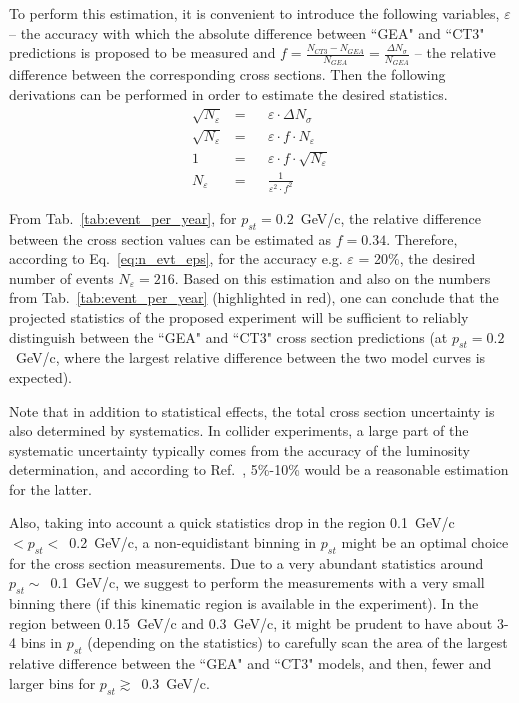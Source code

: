 To perform this estimation, it is convenient to introduce the following variables, $\varepsilon$ -- the accuracy with which the absolute difference between ``GEA" and ``CT3" predictions is proposed to be measured and $f=\frac{N_{CT3} -N_{GEA}}{N_{GEA}}=\frac{\Delta N_{\sigma}}{N_{GEA}}$ -- the relative difference between the corresponding cross sections. Then the following derivations can be performed in order to estimate the desired statistics.
\begin{equation}
\begin{aligned}
\sqrt{N_{\varepsilon}} & = && \varepsilon \cdot \Delta N_{\sigma} \\
\sqrt{N_{\varepsilon}} & = && \varepsilon \cdot f \cdot  N_{\varepsilon}\\
1 & = && \varepsilon \cdot f \cdot \sqrt{N_{\varepsilon}}\\
N_{\varepsilon} &=&& \frac{1}{\varepsilon^{2} \cdot f^{2}}
\end{aligned}\label{eq:n_evt_eps} 
\end{equation}

From Tab.~\ref{tab:event_per_year}, for $p_{st} = 0.2$~GeV/c, the relative difference between the cross section values can be estimated as $f = 0.34$. Therefore, according to Eq.~\eqref{eq:n_evt_eps}, for the accuracy e.g. $\varepsilon$ = 20\%, the desired number of events $N_{\varepsilon} = 216$. Based on this estimation and also on the numbers from Tab.~\ref{tab:event_per_year} (highlighted in red), one can conclude that the projected statistics of the proposed experiment will be sufficient to reliably distinguish between the ``GEA" and ``CT3" cross section predictions (at $p_{st} = 0.2$~GeV/c, where the largest relative difference between the two model curves is expected).  


Note that in addition to statistical effects, the total cross section uncertainty is also determined by systematics. In collider experiments, a large part of the systematic uncertainty typically comes from the accuracy of the luminosity determination, and according to Ref.~\cite{Grafstrom:2015foa}, 5\%-10\% would be a reasonable estimation for the latter.

Also, taking into account a quick statistics drop in the region 0.1~GeV/c~$<p_{st}<$~0.2~GeV/c, a non-equidistant binning in $p_{st}$ might be an optimal choice for the cross section measurements. Due to a very abundant statistics around $p_{st}\sim$~0.1~GeV/c, we suggest to perform the measurements with a very small binning there (if this kinematic region is available in the experiment). In the region between 0.15~GeV/c and 0.3~GeV/c, it might be prudent to have about 3-4 bins in $p_{st}$ (depending on the statistics) to carefully scan the area of the largest relative difference between the ``GEA" and ``CT3" models, and then, fewer and larger bins for $p_{st}\gtrsim$~0.3~GeV/c.




